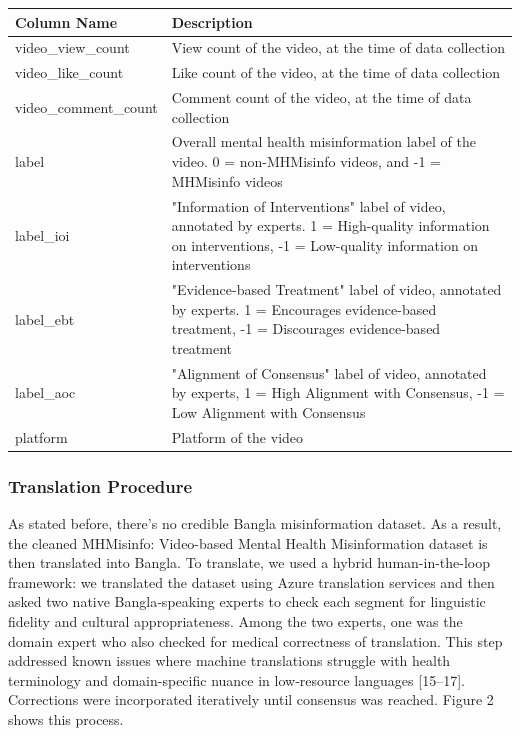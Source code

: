 \documentclass[]{article}
\newcounter{none} %
\begin{document}
{\def\LTcaptype{none} %
\begin{longtable}[]{@{}
  >{\raggedright\arraybackslash}p{}
  >{\raggedright\arraybackslash}p{}@{}}
\toprule\noalign{}
\begin{minipage}[b]{\linewidth}\raggedright
\textbf{Column Name}
\end{minipage} & \begin{minipage}[b]{\linewidth}\raggedright
\textbf{Description}
\end{minipage} \\
\midrule\noalign{}
\endhead
\bottomrule\noalign{}
\endlastfoot
video\_view\_count & View count of the video, at the time of data
collection \\
video\_like\_count & Like count of the video, at the time of data
collection \\
video\_comment\_count & Comment count of the video, at the time of data
collection \\
label & Overall mental health misinformation label of the video. 0 =
non-MHMisinfo videos, and -1 = MHMisinfo videos \\
label\_ioi & "Information of Interventions" label of video, annotated by
experts. 1 = High-quality information on interventions, -1 = Low-quality
information on interventions \\
label\_ebt & "Evidence-based Treatment" label of video, annotated by
experts. 1 = Encourages evidence-based treatment, -1 = Discourages
evidence-based treatment \\
label\_aoc & "Alignment of Consensus" label of video, annotated by
experts, 1 = High Alignment with Consensus, -1 = Low Alignment with
Consensus \\
platform & Platform of the video \\
\end{longtable}
}


\subsubsection{Translation Procedure}\label{translation-procedure}


As stated before, there's no credible Bangla misinformation dataset. As
a result, the cleaned MHMisinfo: Video-based Mental Health Misinformation dataset is then translated into Bangla. To translate, we used a hybrid human-in-the-loop framework: we translated the dataset using Azure translation services and then asked two native Bangla‑speaking experts to check each segment for linguistic fidelity
and cultural appropriateness. Among the two experts, one was the domain
expert who also checked for medical correctness of translation. This
step addressed known issues where machine translations struggle with
health terminology and domain-specific nuance in low‑resource languages
{[}15--17{]}. Corrections were incorporated iteratively until consensus
was reached. Figure 2 shows this process.
\end{document}
